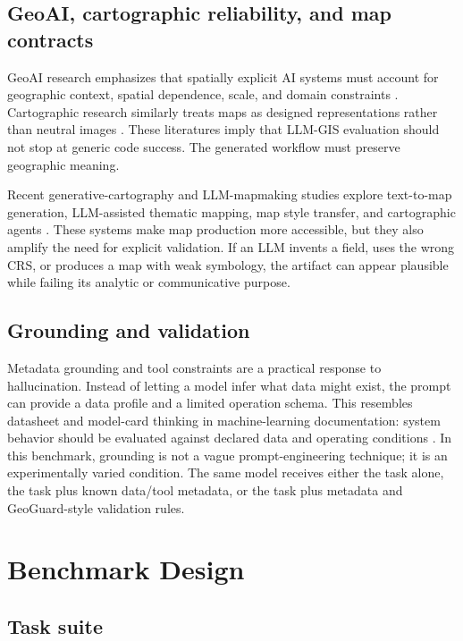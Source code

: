 \documentclass[]{interact}
\begin{document}
\subsection{GeoAI, cartographic reliability, and map contracts}

GeoAI research emphasizes that spatially explicit AI systems must account for geographic context, spatial dependence, scale, and domain constraints \citep{Janowicz_2019,Zhu_2017,Ma_2019,Kang_2024}. Cartographic research similarly treats maps as designed representations rather than neutral images \citep{Harley_1989,Roth_2013,Roth_2015}. These literatures imply that LLM-GIS evaluation should not stop at generic code success. The generated workflow must preserve geographic meaning.

Recent generative-cartography and LLM-mapmaking studies explore text-to-map generation, LLM-assisted thematic mapping, map style transfer, and cartographic agents \citep{Zhang_2024_MapGPT,Yang_2025_MapColorAI,Zhang_2025_MapGenerator,PannoonNetek_2025_Choropleth,Wang_2025_CartoAgent}. These systems make map production more accessible, but they also amplify the need for explicit validation. If an LLM invents a field, uses the wrong CRS, or produces a map with weak symbology, the artifact can appear plausible while failing its analytic or communicative purpose.

\subsection{Grounding and validation}

Metadata grounding and tool constraints are a practical response to hallucination. Instead of letting a model infer what data might exist, the prompt can provide a data profile and a limited operation schema. This resembles datasheet and model-card thinking in machine-learning documentation: system behavior should be evaluated against declared data and operating conditions \citep{Gebru2021Datasheets,Mitchell2019ModelCards}. In this benchmark, grounding is not a vague prompt-engineering technique; it is an experimentally varied condition. The same model receives either the task alone, the task plus known data/tool metadata, or the task plus metadata and GeoGuard-style validation rules.

\section{Benchmark Design}

\subsection{Task suite}
\end{document}
